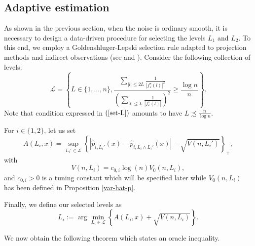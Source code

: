 \documentclass[11pt,a4paper,openany]{article}
\begin{document}
\subsection{Adaptive estimation}\label{adaptation}
As shown in the previous section, when the noise is ordinary smooth, it is necessary to design a data-driven procedure for selecting the levels $L_1$ and $L_2$. To this end, we employ a Goldenshluger-Lepski selection rule adapted to projection methods and indirect observations (see \cite{Chichignoud-Hoang-PhamNgoc-Rivoirard} and \cite{Comte-Lacour}). Consider the following collection of levels: 
\begin{equation}\label{set-L}
\mathcal{L}= \left \{ L \in \{1, \dots ,  n   \}, \frac{\sum_{|l | \leq 2L }   \frac{1}{ |f^\star_{\varepsilon}(l)|^2} }{\left (\sum_{ | l | \leq L}  \frac{1}{ |f^\star_{\varepsilon}(l)| } \right )^2}  \geq \frac{\log n}{n } \right  \}. 
\end{equation}
Note that condition expressed in $(\ref{set-L})$ amounts to have $L  \precsim  \frac{n}{\log n}$. 

For $i \in \{1, 2 \}$, let us set
\begin{equation}\label{def-A-li}
A(L_i, x)=\sup_{L_i'\in \mathcal L} \left  \{| \widehat p_{i, L_i'}(x) - \widehat p_{i, L_i \wedge L_i'}(x)| -\sqrt{V(n, L_i') } \right \}_{+},
\end{equation}
with
$$
 V(n, L_i)= c_{0, i} \log(n) V_0(n, L_i),
$$
and $c_{0, i}>0$ is a tuning constant which will be specified later  while $V_0(n,L_i)$ has been defined in Proposition \ref{var-hat-p}. 
\medskip

Finally, we define our selected levels as 
 \begin{equation}
\hat L_i  := \arg \min_{L _i\in \mathcal L} \left  \{ A(L_i, x) + \sqrt{V(n, L_i)}  \right \}.
\label{equa:adaptive.selection.L1-L2:form}
\end{equation}




\bigskip


We now obtain the following theorem which states an oracle inequality. 
\end{document}
